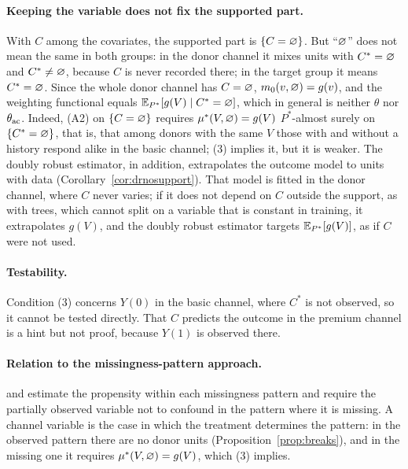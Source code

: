 \paragraph{Keeping the variable does not fix the supported part.} With $C$ among the covariates, the supported part is $\{C=\varnothing\}$. But ``$\varnothing$'' does not mean the same in both groups: in the donor channel it mixes units with $C^*=\varnothing$ and $C^*\ne\varnothing$, because $C$ is never recorded there; in the target group it means $C^*=\varnothing$. Since the whole donor channel has $C=\varnothing$, $m_0(v,\varnothing)=g(v)$, and the weighting functional equals $\mathbb{E}_{P^*}[g(V)\mid C^*=\varnothing]$, which in general is neither $\theta$ nor $\theta_{\mathrm{ac}}$. Indeed, (A2) on $\{C=\varnothing\}$ requires $\mu^*(V,\varnothing)=g(V)$ $P^*$-almost surely on $\{C^*=\varnothing\}$, that is, that among donors with the same $V$ those with and without a history respond alike in the basic channel; (3) implies it, but it is weaker. The doubly robust estimator, in addition, extrapolates the outcome model to units with data (Corollary~\ref{cor:drnosupport}). That model is fitted in the donor channel, where $C$ never varies; if it does not depend on $C$ outside the support, as with trees, which cannot split on a variable that is constant in training, it extrapolates $g(V)$, and the doubly robust estimator targets $\mathbb{E}_{P^*}[g(V)]$, as if $C$ were not used.

\paragraph{Testability.} Condition (3) concerns $Y(0)$ in the basic channel, where $C^*$ is not observed, so it cannot be tested directly. That $C$ predicts the outcome in the premium channel is a hint but not proof, because $Y(1)$ is observed there.

\paragraph{Relation to the missingness-pattern approach.} \citet{dagostino2000} and \citet{blake2020} estimate the propensity within each missingness pattern and require the partially observed variable not to confound in the pattern where it is missing. A channel variable is the case in which the treatment determines the pattern: in the observed pattern there are no donor units (Proposition~\ref{prop:breaks}), and in the missing one it requires $\mu^*(V,\varnothing)=g(V)$, which (3) implies.

